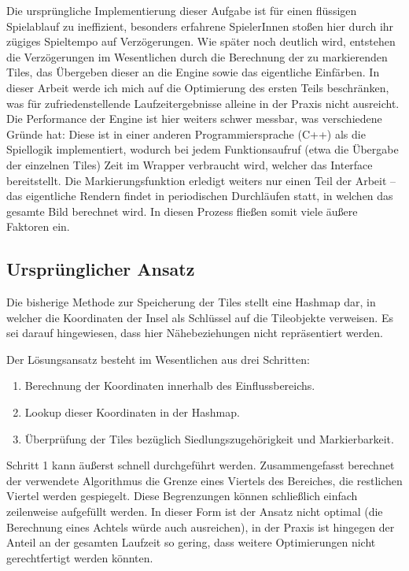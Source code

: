 \documentclass[%
			paper=a4,%
			DIV12,
			liststotoc,
			bibtotoc,
			draft=false,%
			titlepage,
			numbers=noendperiod
			]{scrartcl}
\begin{document}

Die ursprüngliche Implementierung dieser Aufgabe ist für einen flüssigen Spielablauf zu ineffizient, besonders erfahrene SpielerInnen stoßen hier durch ihr zügiges Spieltempo auf Verzögerungen.
Wie später noch deutlich wird, entstehen die Verzögerungen im Wesentlichen durch die Berechnung der zu markierenden Tiles, das Übergeben dieser an die Engine sowie das eigentliche Einfärben. 
In dieser Arbeit werde ich mich auf die Optimierung des ersten Teils beschränken, was für zufriedenstellende Laufzeitergebnisse alleine in der Praxis nicht ausreicht.
Die Performance der Engine ist hier weiters schwer messbar, was verschiedene Gründe hat:
Diese ist in einer anderen Programmiersprache (C++) als die Spiellogik implementiert, wodurch bei jedem Funktionsaufruf (etwa die Übergabe der einzelnen Tiles) Zeit im Wrapper verbraucht wird, welcher das Interface bereitstellt.
Die Markierungsfunktion erledigt weiters nur einen Teil der Arbeit -- das eigentliche Rendern findet in periodischen Durchläufen statt, in welchen das gesamte Bild berechnet wird.
In diesen Prozess fließen somit viele äußere Faktoren ein. 

\subsection{Ursprünglicher Ansatz}

Die bisherige Methode zur Speicherung der Tiles stellt eine Hashmap dar, in welcher die Koordinaten der Insel als Schlüssel auf die Tileobjekte verweisen. 
Es sei darauf hingewiesen, dass hier Nähebeziehungen nicht repräsentiert werden.

Der Lösungsansatz besteht im Wesentlichen aus drei Schritten:
\begin{enumerate}
	\item Berechnung der Koordinaten innerhalb des Einflussbereichs.
	\item Lookup dieser Koordinaten in der Hashmap.
	\item Überprüfung der Tiles bezüglich Siedlungszugehörigkeit und Markierbarkeit.
\end{enumerate}

Schritt 1 kann äußerst schnell durchgeführt werden.
Zusammengefasst berechnet der verwendete Algorithmus die Grenze eines Viertels des Bereiches, die restlichen Viertel werden gespiegelt.
Diese Begrenzungen können schließlich einfach zeilenweise aufgefüllt werden.
In dieser Form ist der Ansatz nicht optimal (die Berechnung eines Achtels würde auch \mbox{ausreichen}), in der Praxis ist hingegen der Anteil an der gesamten Laufzeit so gering, dass weitere Optimierungen nicht gerechtfertigt werden könnten.
\end{document}
